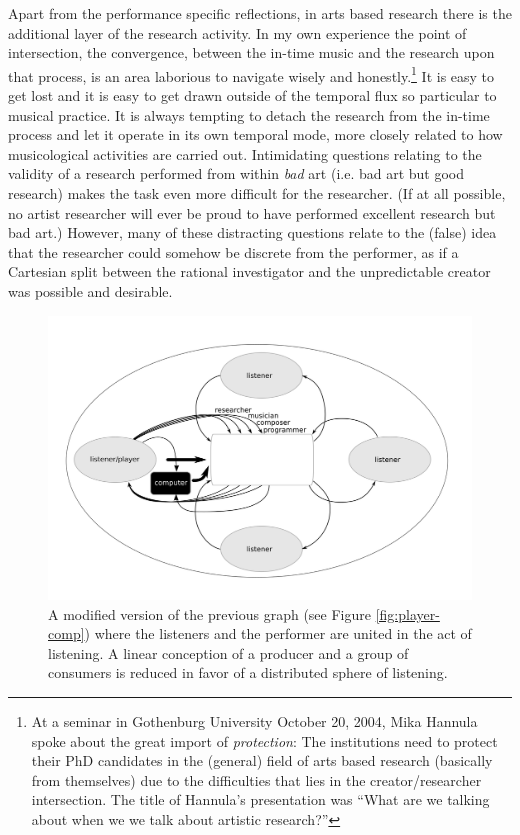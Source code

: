 Apart from the performance specific reflections, in arts based research there is the additional layer of the research activity. In my own experience the point of intersection, the convergence, between the in-time music and the research upon that process, is an area laborious to navigate wisely and honestly.\footnote{At a seminar in Gothenburg University October 20, 2004, Mika Hannula spoke about the great import of \emph{protection}: The institutions need to protect their PhD candidates in the (general) field of arts based research (basically from themselves) due to the difficulties that lies in the creator/researcher intersection. The title of Hannula's presentation was ``What are we talking about when we we talk about artistic research?''} It is easy to get lost and it is easy to get drawn outside of the temporal flux so particular to musical practice. It is always tempting to detach the research from the in-time process and let it operate in its own temporal mode, more closely related to how musicological activities are carried out. Intimidating questions relating to the validity of a research performed from within \emph{bad} art (i.e. bad art but good research) makes the task even more difficult for the researcher. (If at all possible, no artist researcher will ever be proud to have performed excellent research but bad art.) However, many of these distracting questions relate to the (false) idea that the researcher could somehow be discrete from the performer, as if a Cartesian split between the rational investigator and the unpredictable creator was possible and desirable. 

\begin{figure}[htb]
  \centering
  \includegraphics[width=\linewidth]{img/player-listener-computer}
  \caption{\small{A modified version of the previous graph (see Figure \ref{fig:player-comp}) where the listeners and the performer are united in the act of listening. A linear conception of a producer and a group of consumers is reduced in favor of a distributed sphere of listening.}}
  \label{fig:player-comp-2}
\end{figure}

